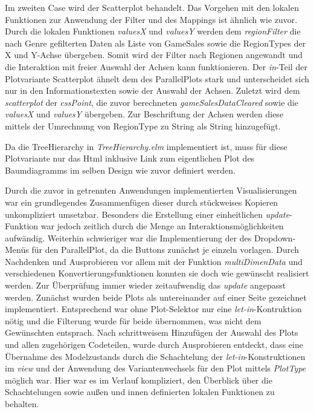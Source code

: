 \documentclass[usegeometry=true]{scrartcl}
\begin{document}
Im zweiten Case wird der Scatterplot behandelt. 
Das Vorgehen mit den lokalen Funktionen zur Anwendung der Filter und des Mappings ist ähnlich wie zuvor.
Durch die lokalen Funktionen \textit{valuesX} und \textit{valuesY} werden dem \textit{regionFilter} die nach Genre gefilterten Daten als Liste von GameSales sowie die RegionTypes der X und Y-Achse übergeben.
Somit wird der Filter nach Regionen angewandt und die Interaktion mit freier Auswahl der Achsen kann funktionieren.
Der \textit{in}-Teil der Plotvariante Scatterplot ähnelt dem des ParallelPlots stark und unterscheidet sich nur in den Informationstexten sowie der Auswahl der Achsen.
Zuletzt wird dem \textit{scatterplot} der \textit{cssPoint}, die zuvor berechneten \textit{gameSalesDataCleared} sowie die \textit{valuesX} und \textit{valuesY} übergeben.
Zur Beschriftung der Achsen werden diese mittels der Umrechnung von RegionType zu String als String hinzugefügt.

Da die TreeHierarchy in \textit{TreeHierarchy.elm} implementiert ist, muss für diese Plotvariante nur das Html inklusive Link zum eigentlichen Plot des Baumdiagramms im selben Design wie zuvor definiert werden.

Durch die zuvor in getrennten Anwendungen implementierten Visualisierungen war ein grundlegendes Zusammenfügen dieser durch stückweises Kopieren unkompliziert umsetzbar.
Besonders die Erstellung einer einheitlichen \textit{update}-Funktion war jedoch zeitlich durch die Menge an Interaktionsmöglichkeiten aufwändig.
Weiterhin schwieriger war die Implementierung der des Dropdown-Menüs für den ParallelPlot, da die Buttons zunächst je einzeln vorlagen. 
Durch Nachdenken und Ausprobieren vor allem mit der Funktion \textit{multiDimenData} und verschiedenen Konvertierungsfunktionen konnten sie doch wie gewünscht realisiert werden.
Zur Überprüfung immer wieder zeitaufwendig das \textit{update} angepasst werden.
Zunächst wurden beide Plots als untereinander auf einer Seite gezeichnet implementiert.
Entsprechend war ohne Plot-Selektor nur eine \textit{let-in}-Kontruktion nötig und die Filterung wurde für beide übernommen, was nicht dem Gewünschten entsprach.
Nach schrittweisem Hinzufügen der Auswahl des Plots und allen zugehörigen Codeteilen, wurde durch Ausprobieren entdeckt, dass eine Übernahme des Modelzustands durch die Schachtelung der \textit{let-in}-Konstruktionen im \textit{view} und der Anwendung des Variantenwechsels für den Plot mittels \textit{PlotType} möglich war. 
Hier war es im Verlauf kompliziert, den Überblick über die Schachtelungen sowie außen und innen definierten lokalen Funktionen zu behalten.
\end{document}
